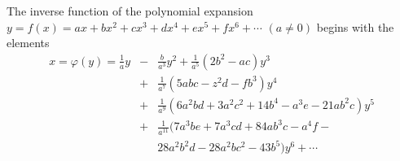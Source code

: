 \documentclass{article}
\begin{document}
\noindent
The inverse function of the polynomial expansion ~~$y = f(x) = ax+bx^2+cx^3
+dx^4 + ex^5 + fx^6+\cdots$ $(a\ne0)$ begins with the elements
\setlength{\arraycolsep}{2pt}
\begin{eqnarray*}
x = \varphi(y) = \frac{1}{a}y &-& \frac{b}{a^3}y^2 + \frac{1}{a^5}(2b^2-ac)y^3\\
   &+&\frac{1}{a^7}(5abc - z^2d -fb^3)y^4\\ 
   &+&\frac{1}{a^9}(6a^2bd + 3a^2c^2+14b^4 - a^3e - 21ab^2c)y^5\\
   &+&\frac{1}{a^{11}}(7a^3be + 7a^3cd + 84ab^3c - a^4f -\\
   &&28a^2b^2d -28 a^2bc^2 - 43b^5)y^6 + \cdots
\end{eqnarray*}
\end{document}
